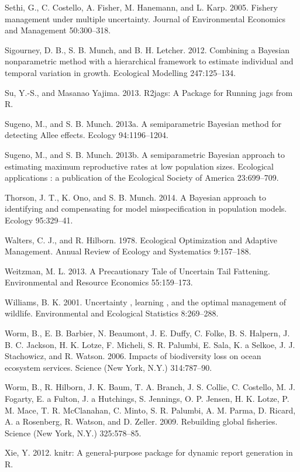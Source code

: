 \documentclass[]{components/elsarticle}
\begin{document}
Sethi, G., C. Costello, A. Fisher, M. Hanemann, and L. Karp. 2005.
Fishery management under multiple uncertainty. Journal of Environmental
Economics and Management 50:300--318.

Sigourney, D. B., S. B. Munch, and B. H. Letcher. 2012. Combining a
Bayesian nonparametric method with a hierarchical framework to estimate
individual and temporal variation in growth. Ecological Modelling
247:125--134.

Su, Y.-S., and Masanao Yajima. 2013. R2jags: A Package for Running jags
from R.

Sugeno, M., and S. B. Munch. 2013a. A semiparametric Bayesian method for
detecting Allee effects. Ecology 94:1196--1204.

Sugeno, M., and S. B. Munch. 2013b. A semiparametric Bayesian approach
to estimating maximum reproductive rates at low population sizes.
Ecological applications : a publication of the Ecological Society of
America 23:699--709.

Thorson, J. T., K. Ono, and S. B. Munch. 2014. A Bayesian approach to
identifying and compensating for model misspecification in population
models. Ecology 95:329--41.

Walters, C. J., and R. Hilborn. 1978. Ecological Optimization and
Adaptive Management. Annual Review of Ecology and Systematics
9:157--188.

Weitzman, M. L. 2013. A Precautionary Tale of Uncertain Tail Fattening.
Environmental and Resource Economics 55:159--173.

Williams, B. K. 2001. Uncertainty , learning , and the optimal
management of wildlife. Environmental and Ecological Statistics
8:269--288.

Worm, B., E. B. Barbier, N. Beaumont, J. E. Duffy, C. Folke, B. S.
Halpern, J. B. C. Jackson, H. K. Lotze, F. Micheli, S. R. Palumbi, E.
Sala, K. a Selkoe, J. J. Stachowicz, and R. Watson. 2006. Impacts of
biodiversity loss on ocean ecosystem services. Science (New York, N.Y.)
314:787--90.

Worm, B., R. Hilborn, J. K. Baum, T. A. Branch, J. S. Collie, C.
Costello, M. J. Fogarty, E. a Fulton, J. a Hutchings, S. Jennings, O. P.
Jensen, H. K. Lotze, P. M. Mace, T. R. McClanahan, C. Minto, S. R.
Palumbi, A. M. Parma, D. Ricard, A. a Rosenberg, R. Watson, and D.
Zeller. 2009. Rebuilding global fisheries. Science (New York, N.Y.)
325:578--85.

Xie, Y. 2012. knitr: A general-purpose package for dynamic report
generation in R.
\end{document}
